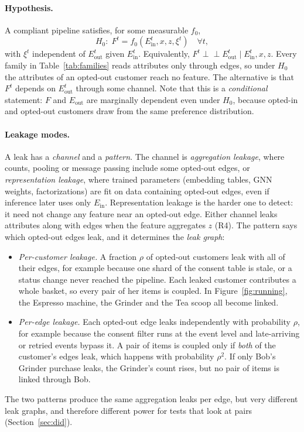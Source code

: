 \documentclass[10pt,twocolumn,letterpaper]{article}
\theoremstyle{definition}
\newcommand{\Ein}{E_{\mathrm{in}}}
\newcommand{\Eout}{E_{\mathrm{out}}}
\newcommand{\indep}{\perp\!\!\!\perp}
\begin{document}
\paragraph{Hypothesis.}
A compliant pipeline satisfies, for some measurable $f_0$,
\begin{equation}
  H_0:\; F^t = f_0(\Ein^t, x, z, \xi^t) \quad \forall t,
  \label{eq:h0}
\end{equation}
with $\xi^t$ independent of $\Eout^t$ given $\Ein^t$. Equivalently,
$F^t \indep \Eout^t \mid \Ein^t, x, z$. Every family in
Table~\ref{tab:families} reads attributes only through edges, so under $H_0$
the attributes of an opted-out customer reach no feature. The alternative is that $F^t$ depends on $\Eout^t$
through some channel. Note that this is a \emph{conditional} statement: $F$ and
$\Eout$ are marginally dependent even under $H_0$, because opted-in and
opted-out customers draw from the same preference distribution.

\paragraph{Leakage modes.}
A leak has a \emph{channel} and a \emph{pattern}. The channel is
\emph{aggregation leakage}, where counts, pooling or message passing include
some opted-out edges, or \emph{representation leakage}, where trained
parameters (embedding tables, GNN weights, factorizations) are fit on data
containing opted-out edges, even if inference later uses only $\Ein$.
Representation leakage is the harder one to detect: it need not change any
feature near an opted-out edge. Either channel leaks attributes along with
edges when the feature aggregates $z$ (R4). The pattern says which opted-out
edges leak, and it determines the \emph{leak graph}:
\begin{itemize}
  \item \emph{Per-customer leakage.} A fraction $\rho$ of opted-out customers
        leak with all of their edges, for example because one shard of the
        consent table is stale, or a status change never reached the
        pipeline. Each leaked customer contributes a whole basket, so every
        pair of her items is coupled. In Figure~\ref{fig:running}, the
        Espresso machine, the Grinder and the Tea scoop all become linked.
  \item \emph{Per-edge leakage.} Each opted-out edge leaks independently with
        probability $\rho$, for example because the consent filter runs at the
        event level and late-arriving or retried events bypass it. A pair of
        items is coupled only if \emph{both} of the customer's edges leak,
        which happens with probability $\rho^2$. If only Bob's Grinder
        purchase leaks, the Grinder's count rises, but no pair of items is
        linked through Bob.
\end{itemize}
The two patterns produce the same aggregation leaks per edge, but very
different leak graphs, and therefore different power for tests that look at
pairs (Section~\ref{sec:did}).
\end{document}
